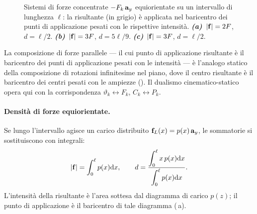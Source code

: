 \begin{esempio}
\begin{figure}[htbp]
{}
		\qquad
		\caption{Sistemi di forze concentrate $-F_k\,\mathbf{a}_y$
			equiorientate su un intervallo di lunghezza $\ell$:
			la risultante (in grigio) è applicata nel baricentro
			dei punti di applicazione pesati con le rispettive
			intensità.
			\textbf{\textit{(a)}}~$|\mathbf{f}|=2F$, $d=\ell/2$.
			\textbf{\textit{(b)}}~$|\mathbf{f}|=3F$, $d=5\ell/9$.
			\textbf{\textit{(c)}}~$|\mathbf{f}|=3F$, $d=\ell/2$.}
		\label{fig:forze_concentrate_intervallo}
	\end{figure}
\end{esempio}


\begin{oss}
	La composizione di forze parallele --- il cui punto di
	applicazione risultante è il baricentro dei punti di
	applicazione pesati con le intensità --- è l'analogo
	statico della composizione di rotazioni infinitesime nel
	piano, dove il centro risultante è il baricentro dei
	centri pesati con le ampiezze
	(). Il dualismo
	cinematico-statico opera qui con la corrispondenza
	$\vartheta_k \leftrightarrow F_k$, $C_k \leftrightarrow P_k$.
\end{oss}


\paragraph{Densità di forze equiorientate.}
Se lungo l'intervallo agisce un carico distribuito
$\mathbf{f}_L(x) = p(x)\,\mathbf{a}_y$, le sommatorie si sostituiscono
con integrali:
\begin{equation}
	|\mathbf{f}| = \int_0^{\ell} p(x)\mathrm{d} x, \qquad
	d = \frac{\displaystyle\int_0^{\ell}
		x\,p(x)\mathrm{d} x}{\displaystyle\int_0^{\ell}
		p(x)\mathrm{d} x}.
\end{equation}
L'intensità della risultante è l'area sottesa dal diagramma
di carico $p(z)$; il punto di applicazione è il baricentro
di tale diagramma (\,a).

